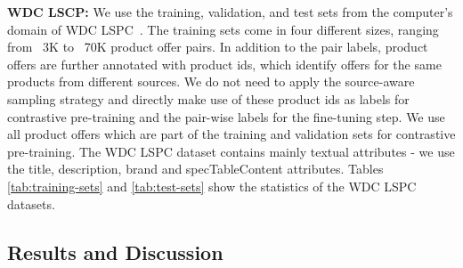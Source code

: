 \documentclass[sigconf]{acmart}
\begin{document}
\begin{table}[htb]
\centering
\caption{Test set Statistics}
\label{tab:test-sets}
\end{table}


\textbf{WDC LSCP:} We use the training, validation, and test sets from the computer's domain of WDC LSPC~\cite{primpeli2019wdc}. The training sets come in four different sizes, ranging from ~3K to ~70K product offer pairs. In addition to the pair labels, product offers are further annotated with product ids, which identify offers for the same products from different sources. We do not need to apply the source-aware sampling strategy and directly make use of these product ids as labels for contrastive pre-training and the pair-wise labels for the fine-tuning step. We use all product offers which are part of the training and validation sets for contrastive pre-training. The WDC LSPC dataset contains mainly textual attributes - we use the title, description, brand and specTableContent attributes. Tables \ref{tab:training-sets} and \ref{tab:test-sets} show the statistics of the WDC LSPC datasets.



\subsection{Results and Discussion}
\label{subsec:results}
\end{document}
